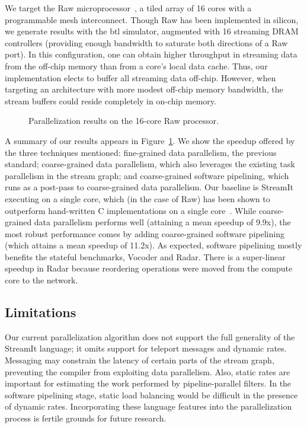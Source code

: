 We target the Raw microprocessor~\cite{raw10,raw}, a tiled array of 16
cores with a programmable mesh interconnect.  Though Raw has been
implemented in silicon, we generate results with the btl simulator,
augmented with 16 streaming DRAM controllers (providing enough
bandwidth to saturate both directions of a Raw port).  In this
configuration, one can obtain higher throughput in streaming data from
the off-chip memory than from a core's local data cache.  Thus, our
implementation elects to buffer all streaming data off-chip.  However,
when targeting an architecture with more modest off-chip memory
bandwidth, the stream buffers could reside completely in on-chip
memory.

\begin{figure}[t]
\centering
{}
\caption[Parallelization results]{Parallelization results on the
  16-core Raw processor.\protect\label{fig:par-results}}
\end{figure}

A summary of our results appears in Figure~\ref{fig:par-results}.  We
show the speedup offered by the three techniques mentioned:
fine-grained data parallelism, the previous standard; coarse-grained
data parallelism, which also leverages the existing task parallelism
in the stream graph; and coarse-grained software pipelining, which
runs as a post-pass to coarse-grained data parallelism.  Our baseline
is StreamIt executing on a single core, which (in the case of Raw) has
been shown to outperform hand-written C implementations on a single
core~\cite{raw_isca}.  While coarse-grained data parallelism performs
well (attaining a mean speedup of 9.9x), the most robust performance
comes by adding coarse-grained software pipelining (which attains a
mean speedup of 11.2x).  As expected, software pipelining mostly
benefits the stateful benchmarks, Vocoder and Radar.  There is a
super-linear speedup in Radar because reordering operations were moved
from the compute core to the network.

\subsection*{Limitations}

Our current parallelization algorithm does not support the full
generality of the StreamIt language; it omits support for teleport
messages and dynamic rates.  Messaging may constrain the latency of
certain parts of the stream graph, preventing the compiler from
exploiting data parallelism.  Also, static rates are important for
estimating the work performed by pipeline-parallel filters.  In the
software pipelining stage, static load balancing would be difficult in
the presence of dynamic rates.  Incorporating these language features
into the parallelization process is fertile grounds for future
research.

